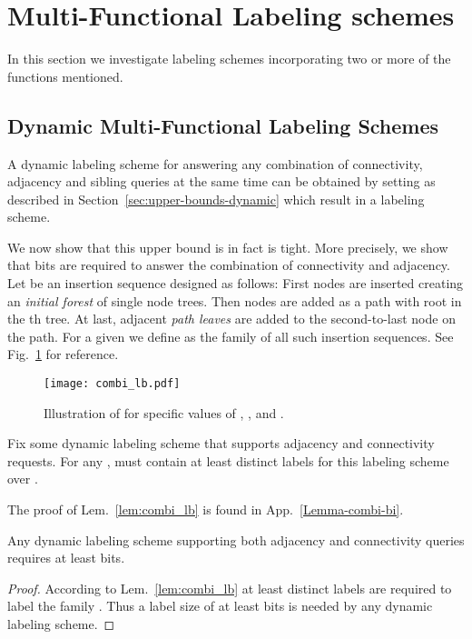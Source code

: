 \documentclass{llncs}
\begin{document}
\section{Multi-Functional Labeling schemes}
In this section we investigate labeling schemes incorporating  two or more of the functions mentioned.
\subsection{Dynamic Multi-Functional Labeling Schemes}
A dynamic labeling scheme for answering any combination of connectivity, adjacency and sibling queries at the same time can be obtained by setting   as described in Section~\ref{sec:upper-bounds-dynamic}  which result in a  labeling scheme.

 We  now show that this upper bound is in fact is tight.
 More precisely, we show that  bits are required to answer  the combination of connectivity and adjacency.
  Let  be an insertion sequence designed as follows: First  nodes are inserted creating an \emph{initial
forest} of single node trees. Then  nodes are added as a path with root in
the th tree. At last,  adjacent \emph{path leaves} are added to the
second-to-last node on the path. For a given  we define  as the family
of all such insertion sequences. See Fig.~\ref{fig:combi_lb} for reference.
\begin{figure}[h]
    \centering
    \texttt{[image: combi\_lb.pdf]}
    \caption{Illustration of  for specific values of , , and
    .}
    \label{fig:combi_lb}
\end{figure}

\begin{lemma}\label{lem:combi_lb}
   Fix some dynamic labeling scheme that supports adjacency and connectivity requests.
    For any ,  must contain at least  distinct labels for this labeling scheme over .
\end{lemma}
The  proof of  Lem.~\ref{lem:combi_lb} is found in  App.~\ref{Lemma-combi-bi}.

\begin{theorem}\label{thm:combo_dyn}
    Any dynamic labeling scheme supporting both adjacency and connectivity
    queries requires at least  bits.
\end{theorem}
\begin{proof}
	According to Lem.~\ref{lem:combi_lb} at least
	 distinct labels
	are required to label the family . Thus a label size of at least  bits is needed by any dynamic labeling scheme.
\end{proof}
\end{document}
